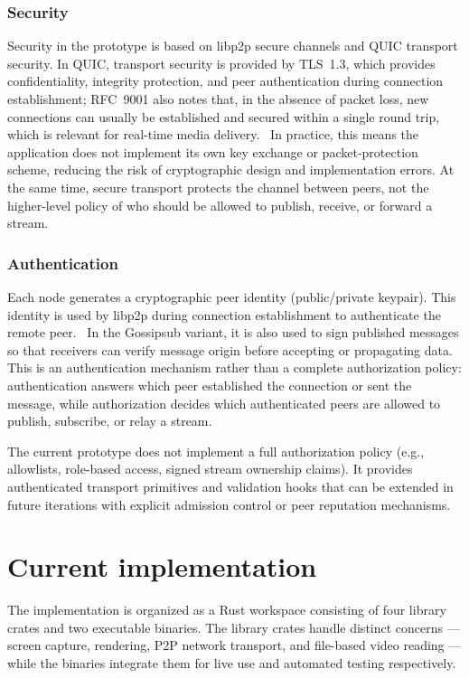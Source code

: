 \subsubsection{Security}
Security in the prototype is based on libp2p secure channels and \ac{QUIC} transport security. In \ac{QUIC}, transport security is provided by \ac{TLS}~1.3, which provides confidentiality, integrity protection, and peer authentication during connection establishment; RFC~9001 also notes that, in the absence of packet loss, new connections can usually be established and secured within a single round trip, which is relevant for real-time media delivery.~\cite{thomsonUsingTLSSecure2021} In practice, this means the application does not implement its own key exchange or packet-protection scheme, reducing the risk of cryptographic design and implementation errors. At the same time, secure transport protects the channel between peers, not the higher-level policy of who should be allowed to publish, receive, or forward a stream.~\cite{SecurityConsiderations}
\subsubsection{Authentication}
Each node generates a cryptographic peer identity (public/private keypair). This identity is used by libp2p during connection establishment to authenticate the remote peer.~\cite{SecurityConsiderations} In the Gossipsub variant, it is also used to sign published messages so that receivers can verify message origin before accepting or propagating data.~\cite{SecurityConsiderations,SpecsPubsubGossipsub} This is an authentication mechanism rather than a complete authorization policy: authentication answers which peer established the connection or sent the message, while authorization decides which authenticated peers are allowed to publish, subscribe, or relay a stream.~\cite{SecurityConsiderations}

The current prototype does not implement a full authorization policy (e.g., allowlists, role-based access, signed stream ownership claims). It provides authenticated transport primitives and validation hooks that can be extended in future iterations with explicit admission control or peer reputation mechanisms.

\section{Current implementation}
The implementation is organized as a Rust workspace consisting of four library crates and two executable binaries. The library crates handle distinct concerns --- screen capture, rendering, \ac{P2P} network transport, and file-based video reading --- while the binaries integrate them for live use and automated testing respectively.

